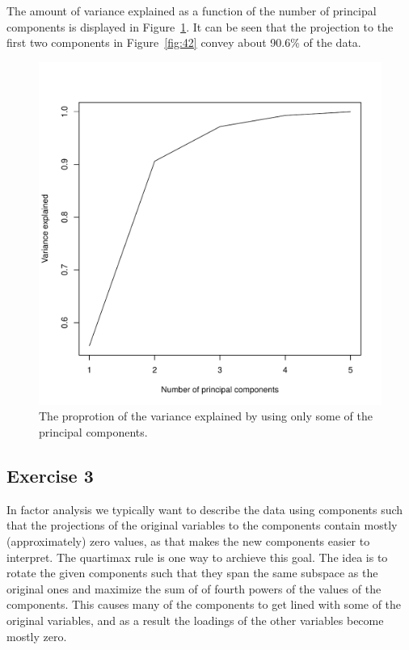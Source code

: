 \documentclass{article}
\begin{document}
The amount of variance explained as a function of the number of principal components is displayed in Figure~\ref{fig:varamount}.
It can be seen that the projection to the first two components in Figure~\ref{fig:42} convey about 90.6\% of the data.

\begin{figure}\centering
	\includegraphics[scale=\sscale]{varamount}
	\caption{The proprotion of the variance explained by using only some of the principal components.}\label{fig:varamount}
\end{figure}

\subsection{Exercise 3}
In factor analysis we typically want to describe the data using components such that the projections of the original variables to the components contain mostly (approximately) zero values, as that makes the new components easier to interpret.
The quartimax rule is one way to archieve this goal.
The idea is to rotate the given components such that they span the same subspace as the original ones and maximize the sum of of fourth powers of the values of the components.
This causes many of the components to get lined with some of the original variables, and as a result the loadings of the other variables become mostly zero.
\end{document}

